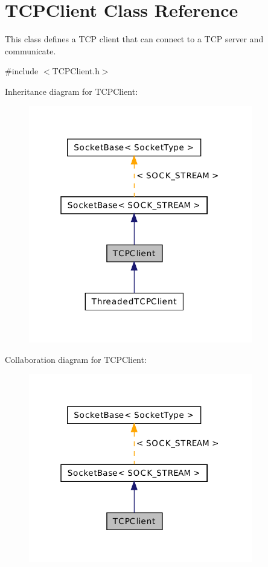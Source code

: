 \hypertarget{class_t_c_p_client}{\section{T\-C\-P\-Client Class Reference}
\label{class_t_c_p_client}
}


This class defines a T\-C\-P client that can connect to a T\-C\-P server and communicate.  




{\ttfamily \#include $<$T\-C\-P\-Client.\-h$>$}



Inheritance diagram for T\-C\-P\-Client\-:\nopagebreak
\begin{figure}[H]
\begin{center}
\leavevmode
\includegraphics[width=277pt]{class_t_c_p_client__inherit__graph}
\end{center}
\end{figure}


Collaboration diagram for T\-C\-P\-Client\-:\nopagebreak
\begin{figure}[H]
\begin{center}
\leavevmode
\includegraphics[width=277pt]{class_t_c_p_client__coll__graph}
\end{center}
\end{figure}
